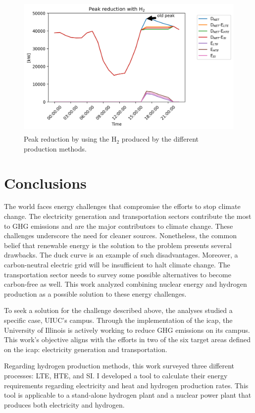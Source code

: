 \begin{figure}[htbp!]
    \centering
	\includegraphics[height=7cm]{figures-hydro/uiuc-hydro3}
	\hfill
	\caption{Peak reduction by using the H$_2$ produced by the different production methods.}
	\label{fig:uiuc-duck3}
\end{figure}

\section{Conclusions}
\label{sec:hydro-conc}

The world faces energy challenges that compromise the efforts to stop climate change.
The electricity generation and transportation sectors contribute the most to GHG emissions and are the major contributors to climate change.
These challenges underscore the need for cleaner sources.
Nonetheless, the common belief that renewable energy is the solution to the problem presents several drawbacks.
The duck curve is an example of such disadvantages.
Moreover, a carbon-neutral electric grid will be insufficient to halt climate change.
The transportation sector needs to survey some possible alternatives to become carbon-free as well.
This work analyzed combining nuclear energy and hydrogen production as a possible solution to these energy challenges.

To seek a solution for the challenge described above, the analyses studied a specific case, UIUC's campus.
Through the implementation of the \gls{icap}, the University of Illinois is actively working to reduce \gls{GHG} emissions on its campus.
This work's objective aligns with the efforts in two of the six target areas defined on the \gls{icap}: electricity generation and transportation.

Regarding hydrogen production methods, this work surveyed three different processes: \gls{LTE}, \gls{HTE}, and \gls{SI}.
I developed a tool to calculate their energy requirements regarding electricity and heat and hydrogen production rates.
This tool is applicable to a stand-alone hydrogen plant and a nuclear power plant that produces both electricity and hydrogen.

